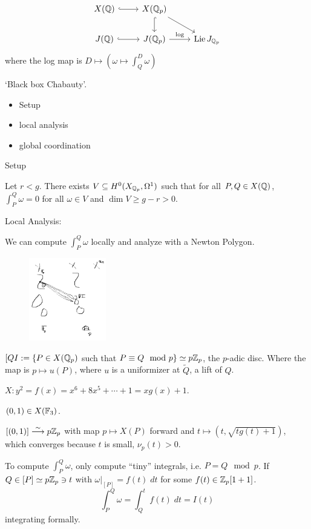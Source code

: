 	
	\[
	\begin{tikzcd}
	X(\Q) \arrow[hook]{r} & X(\Q_p) \arrow[hook]{d} \arrow{dr} \\
	J(\Q) \arrow[hook]{r} & J(\Q_p) \arrow{r}{\log} &  \lie J_{\Qp}
	\end{tikzcd}
	\]
where the log map is $D \mapsto (\omega \mapsto \int_Q^D \omega)$


`Black box Chabauty'.

\begin{itemize}
\item Setup
\item local analysis
\item global coordination 
\end{itemize}


Setup

Let $r<g$. There exists $V \subseteq H^0(X_{\mathbb{Q}_p}, \Omega^1)$ such that for all $P,Q \in X(\mathbb{Q})$, $\int_P^Q \omega= 0$ for all $\omega \in V$ and $\dim V \geq g-r > 0$.


Local Analysis:

We can compute $\int_P^Q \omega$ locally and analyze with a Newton Polygon.

	\begin{figure}[!ht]
	\centering
	\includegraphics[width=0.3\textwidth]{../images/im3.png}
	\end{figure}

$[QI:= \{P \in X(\mathbb{Q}_p)$ such that $P \equiv Q \mod p \} \simeq p\mathbb{Z}_p$, the $p$-adic disc. Where the map is $p \mapsto u(P)$, where $u$ is a uniformizer at $\tilde{Q}$, a lift of $Q$.


\begin{ex}[HP survey]
$X: y^2= f(x)= x^6+8x^5+\cdots+1= xg(x)+1$.

$(0,1) \in X(\mathbb{F}_3)$.

$[(0,1)] \stackrel{\sim}{\longrightarrow} p\mathbb{Z}_p$ with map $p \mapsto X(P)$ forward and $t \mapsto (t,\sqrt{tg(t)+1})$, which converges because $t$ is small, $\nu_p(t) > 0$. 
\end{ex}


To compute $\int_P^Q \omega$, only compute ``tiny'' integrals, i.e. $P=Q \mod p$. If $Q \in [P] \simeq p \mathbb{Z}_p \ni t$ with $\omega |_{[P]} = f(t) \;dt$ for some $f(t) \in \mathbb{Z}_p[1+1]$.
	\[
	\int_P^Q \omega= \int_Q^t f(t) \;dt = I(t)
	\]
integrating formally. 

























